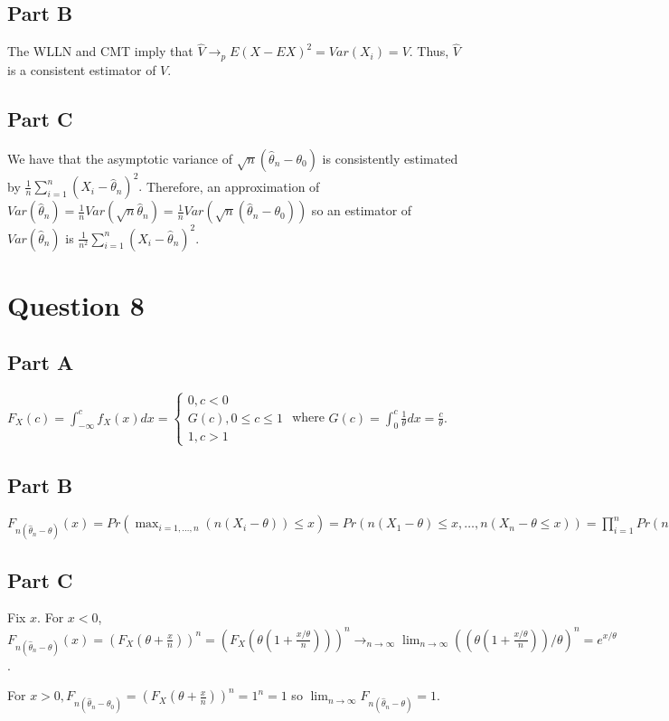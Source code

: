 \documentclass[11pt]{article} %
\begin{document}
\subsection{Part B}
The WLLN and CMT imply that $\hat{V} \rightarrow_p E(X - EX)^2 = Var(X_i) = V$. Thus, $\hat{V}$ is a consistent estimator of $V$.
\subsection{Part C}
We have that the asymptotic variance of $\sqrt{n}(\hat{\theta}_n - \theta_0)$ is consistently estimated by $\frac{1}{n}\sum_{i=1}^{n}(X_i - \hat{\theta}_n)^2.$ Therefore, an approximation of $Var(\hat{\theta}_n) =\frac{1}{n}Var(\sqrt{n}\hat{\theta}_n) = \frac{1}{n}Var(\sqrt{n}(\hat{\theta}_n - \theta_0))$ so an estimator of $Var(\hat{\theta}_n)$ is $\frac{1}{n^2}\sum_{i=1}^{n}(X_i - \hat{\theta}_n)^2.$
\section{Question 8} %
\subsection{Part A}
$F_X(c) = \int_{-\infty}^c f_X(x)dx = \begin{cases} 0, c<0 \\ G(c), 0\leq c \leq 1 \\1, c>1 \end{cases}$ where $G(c) = \int_{0}^c \frac{1}{\theta} dx = \frac{c}{\theta}.$
\subsection{Part B}
$F_{n(\hat{\theta}_n - \theta)}(x) = Pr(\max_{i=1,\dots,n}(n(X_i - \theta))\leq x) = Pr(n(X_1 - \theta) \leq x,\dots,n(X_n - \theta \leq x)) = \prod_{i=1}^n Pr(n(X_i - \theta)\leq x) = \prod_{i=1}^nPr(X_i\leq \theta + \frac{x}{n}) = Pr(X_i\leq \theta + \frac{x}{n})^n = (F_X(\theta + \frac{x}{n}))^n.$
\subsection{Part C}
Fix $x$. For $x<0$, $F_{n(\hat{\theta}_n - \theta)}(x) =(F_X(\theta + \frac{x}{n}))^n = (F_X(\theta(1 + \frac{x/\theta}{n})))^n  \rightarrow_{n\rightarrow \infty} \lim_{n\rightarrow \infty} ((\theta(1 + \frac{x/\theta}{n}))/\theta)^n = e^{x/\theta} $.

For $x>0, F_{n(\hat{\theta}_n - \theta_0)} = (F_{X}(\theta + \frac{x}{n}))^n = 1^n =1$ so $\lim_{n\rightarrow \infty}F_{n(\hat{\theta}_n - \theta)} = 1.$
\end{document}
